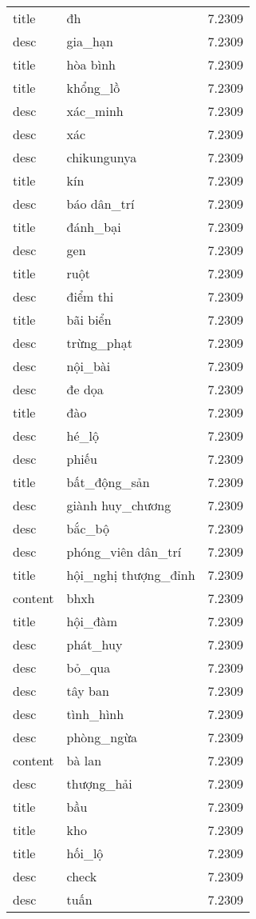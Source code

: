 \documentclass{article}
\begin{document}
\begin{tabular}{lll}
title & đh & 7.2309\\
desc & gia\_hạn & 7.2309\\
title & hòa bình & 7.2309\\
title & khổng\_lồ & 7.2309\\
desc & xác\_minh & 7.2309\\
desc & xác & 7.2309\\
desc & chikungunya & 7.2309\\
title & kín & 7.2309\\
desc & báo dân\_trí & 7.2309\\
title & đánh\_bại & 7.2309\\
desc & gen & 7.2309\\
title & ruột & 7.2309\\
desc & điểm thi & 7.2309\\
title & bãi biển & 7.2309\\
desc & trừng\_phạt & 7.2309\\
desc & nội\_bài & 7.2309\\
desc & đe dọa & 7.2309\\
title & đào & 7.2309\\
desc & hé\_lộ & 7.2309\\
desc & phiếu & 7.2309\\
title & bất\_động\_sản & 7.2309\\
desc & giành huy\_chương & 7.2309\\
desc & bắc\_bộ & 7.2309\\
desc & phóng\_viên dân\_trí & 7.2309\\
title & hội\_nghị thượng\_đỉnh & 7.2309\\
content & bhxh & 7.2309\\
title & hội\_đàm & 7.2309\\
desc & phát\_huy & 7.2309\\
desc & bỏ\_qua & 7.2309\\
desc & tây ban & 7.2309\\
desc & tình\_hình & 7.2309\\
desc & phòng\_ngừa & 7.2309\\
content & bà lan & 7.2309\\
desc & thượng\_hải & 7.2309\\
title & bầu & 7.2309\\
title & kho & 7.2309\\
title & hối\_lộ & 7.2309\\
desc & check & 7.2309\\
desc & tuấn & 7.2309\\

\end{tabular}
\end{document}
